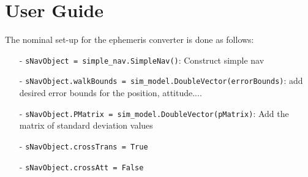 \section{User Guide}

The nominal set-up for the ephemeris converter is done as follows:

\begin{itemize}
\item[-]     \texttt{sNavObject = simple\_nav.SimpleNav()}: Construct simple nav
\item[-]     \texttt{sNavObject.walkBounds = sim\_model.DoubleVector(errorBounds)}: add desired error bounds for the position, attitude....
\item[-]     \texttt{sNavObject.PMatrix = sim\_model.DoubleVector(pMatrix)}: Add the matrix of standard deviation values
\item[-]    \texttt{sNavObject.crossTrans = True}
\item[-]    \texttt{sNavObject.crossAtt = False}
\end{itemize}